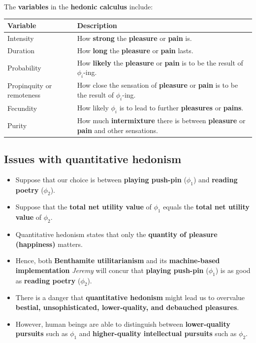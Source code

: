 \documentclass[11pt]{article}
\begin{document}
The \textbf{variables} in the \textbf{hedonic calculus} include:
\begin{center}
\begin{tabular}{|m{5em}|m{25em}|}
\hline
Variable & Description\\
\hline
Intensity & How \textbf{strong} the \textbf{pleasure} or \textbf{pain} is.\\
\hline
Duration & How \textbf{long} the \textbf{pleasure} or \textbf{pain} lasts.\\
\hline
Probability & How \textbf{likely} the \textbf{pleasure} or \textbf{pain} is to be the result of \(\phi_i\)-ing.\\
\hline
Propinquity or remoteness & How close the sensation of \textbf{pleasure} or \textbf{pain} is to be the result of \(\phi_i\)-ing.\\
\hline
Fecundity & How likely \(\phi_i\) is to lead to further \textbf{pleasures} or \textbf{pains}.\\
\hline
Purity & How much \textbf{intermixture} there is between \textbf{pleasure} or \textbf{pain} and other sensations.\\
\hline
\end{tabular}
\end{center}
\subsection{Issues with quantitative hedonism}
\label{sec:org6f902ed}
\begin{itemize}
\item Suppose that our choice is between \textbf{playing push-pin} (\(\phi_1\)) and \textbf{reading poetry} (\(\phi_2\)).
\item Suppose that the \textbf{total net utility value} of \(\phi_1\) equals the \textbf{total net utility value} of \(\phi_2\).
\item Quantitative hedonism states that only the \textbf{quantity of pleasure (happiness)} matters.
\item Hence, both \textbf{Benthamite utilitarianism} and its \textbf{machine-based implementation} \emph{Jeremy} will concur that \textbf{playing push-pin} (\(\phi_1\)) is as good as \textbf{reading poetry} (\(\phi_2\)).
\item There is a danger that \textbf{quantitative hedonism} might lead us to overvalue \textbf{bestial, unsophisticated, lower-quality, and debauched pleasures}.
\item However, human beings are able to distinguish between \textbf{lower-quality pursuits} such as \(\phi_1\) and \textbf{higher-quality intellectual pursuits} such as \(\phi_2\).
\end{itemize}
\end{document}
